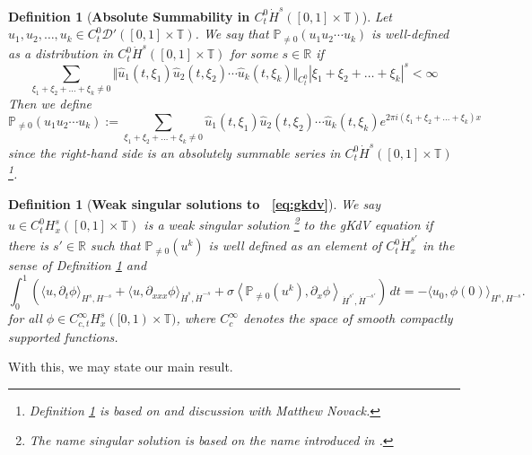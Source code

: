 \documentclass[12pt,reqno,letterpaper]{amsart}
\numberwithin{equation}{section}
\newcommand{\1}{{\bf 1}}
\newcommand{\2}{{\bf 2}}
\newcommand{\R}{\mathbb R}
\newcommand{\T}{\mathbb T}
\newtheorem{definition}[theorem]{Definition}
\theoremstyle{remark}
\theoremstyle{remark}
\begin{document}
\begin{definition}[\textbf{Absolute Summability in $C_t^0 \dot H^s([0,1] \times \T)$}]\label{def:paras}
    Let $u_1,u_2,\ldots,u_k \in C_t^0 \mathcal{D}'([0,1] \times \T)$.  We say that $\mathbb{P}_{\not = 0}(u_1u_2 \cdots u_k)$ is well-defined as a distribution in $C_t^0 \dot{H}^s([0,1] \times \T)$ for some $s \in \R$ if
    $$
    \sum_{\xi_1 + \xi_2 + \ldots + \xi_k \not =0 } \Vert \hat{u}_1(t,\xi_1) \hat{u}_2(t,\xi_2) \cdots \hat{u}_k(t,\xi_k)\Vert_{C_t^0} |\xi_1 + \xi_2 + \ldots + \xi_k|^{s} < \infty
    $$
    Then we define
    $$
        \mathbb{P}_{\not = 0}(u_1u_2\cdots u_k) := \sum_{\xi_1 + \xi_2 + \ldots + \xi_k \not=0} \hat{u}_1(t,\xi_1) \hat{u}_2(t,\xi_2) \cdots \hat{u}_k(t,\xi_k) e^{2\pi i (\xi_1 + \xi_2 + \ldots + \xi_k)x}
    $$
    since the right-hand side is an absolutely summable series in $C_t^0 \dot H^s([0,1] \times \T)$\footnote{Definition \ref{def:paras} is based on \cite[Definition 1]{LR} and discussion with Matthew Novack.}.
\end{definition}



\begin{definition}[\textbf{Weak singular solutions to ~\eqref{eq:gkdv}}] \label{def:weak_para_soln}
    We say $u \in C_t^0 H^s_x([0,1] \times \T)$ is a weak singular solution \footnote{The name \textit{singular solution} is based on the name introduced in \cite{CH}.} to the \textsf{gKdV} equation if there is $s' \in \R$ such that $\mathbb{P}_{\not = 0}(u^k)$ is well defined as an element of $C_t^0\dot{H}_x^{s'}$ in the sense of Definition \ref{def:paras} and
    $$
    \int_0^1 \left(\langle u,\partial_t \phi \rangle_{H^s,H^{-s}} + \langle u, \partial_{xxx}\phi \rangle_{\dot{H}^s,\dot{H}^{-s}} + \sigma \left\langle \mathbb{P}_{\not=0}\left(u^k\right), \partial_x \phi \right\rangle_{\dot{H}^{s'},\dot{H}^{-s'}}\right)\, dt =  -\langle u_0, \phi(0) \rangle_{H^s,H^{-s}}.
    $$
    for all $\phi \in C^\infty_{c,t} H^{s}_x([0,1) \times \T)$, where $C_c^\infty$ denotes the space of smooth compactly supported functions.

    
\end{definition}

With this, we may state our main result.
\end{document}
